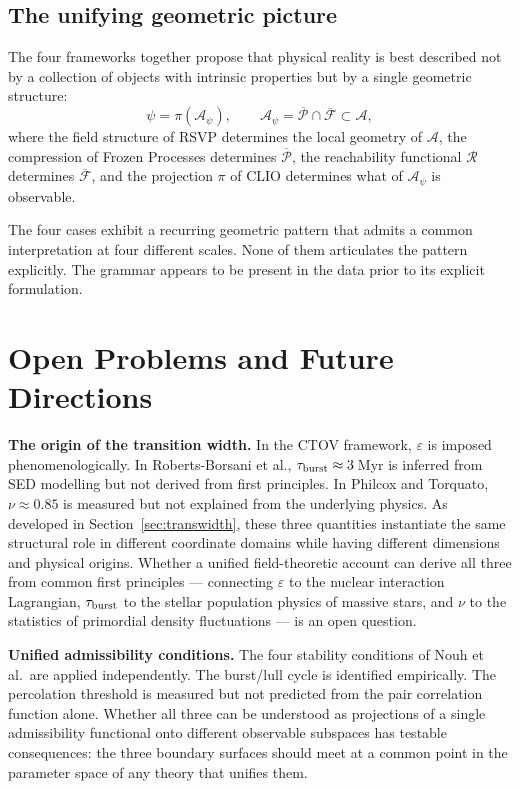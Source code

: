 \documentclass[12pt, oneside]{article}
\begin{document}
\subsection{The unifying geometric picture}

The four frameworks together propose that physical reality is best described not by a collection of objects with intrinsic properties but by a single geometric structure:
\[
\psi = \pi(\mathcal{A}_\psi), \qquad \mathcal{A}_\psi = \overline{\mathcal{P}} \cap \overline{\mathcal{F}} \subset \mathcal{A},
\]
where the field structure of RSVP determines the local geometry of $\mathcal{A}$, the compression of Frozen Processes determines $\overline{\mathcal{P}}$, the reachability functional $\mathcal{R}$ determines $\overline{\mathcal{F}}$, and the projection $\pi$ of CLIO determines what of $\mathcal{A}_\psi$ is observable.

The four cases exhibit a recurring geometric pattern that admits a common interpretation at four different scales. None of them articulates the pattern explicitly. The grammar appears to be present in the data prior to its explicit formulation.

\section{Open Problems and Future Directions}
\label{sec:open}

\textbf{The origin of the transition width.} In the CTOV framework, $\varepsilon$ is imposed phenomenologically. In Roberts-Borsani et al., $\tau_{\rm burst} \approx 3$\,Myr is inferred from SED modelling but not derived from first principles. In Philcox and Torquato, $\nu \approx 0.85$ is measured but not explained from the underlying physics. As developed in Section~\ref{sec:transwidth}, these three quantities instantiate the same structural role in different coordinate domains while having different dimensions and physical origins. Whether a unified field-theoretic account can derive all three from common first principles --- connecting $\varepsilon$ to the nuclear interaction Lagrangian, $\tau_{\rm burst}$ to the stellar population physics of massive stars, and $\nu$ to the statistics of primordial density fluctuations --- is an open question.

\textbf{Unified admissibility conditions.} The four stability conditions of Nouh et al.\ are applied independently. The burst/lull cycle is identified empirically. The percolation threshold is measured but not predicted from the pair correlation function alone. Whether all three can be understood as projections of a single admissibility functional onto different observable subspaces has testable consequences: the three boundary surfaces should meet at a common point in the parameter space of any theory that unifies them.
\end{document}
